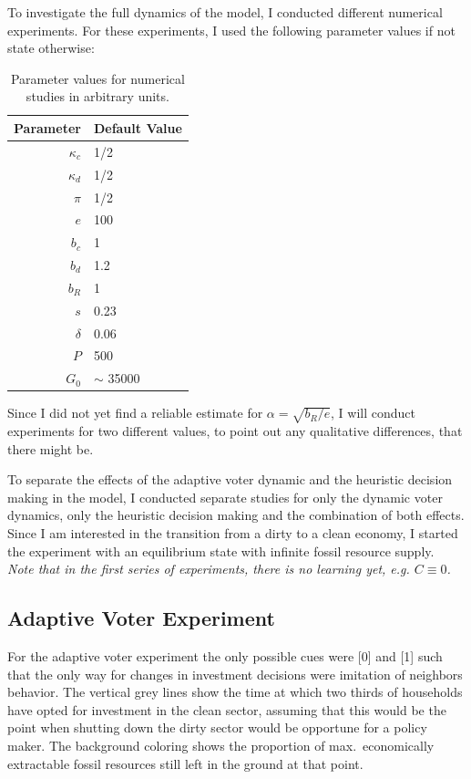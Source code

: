 To investigate the full dynamics of the model, I conducted different numerical experiments. For these experiments, I used the following parameter values if not state otherwise:

\begin{table}[H] 
	\centering
	\begin{tabular}{r|l}
		Parameter & Default Value \\\hline
		$\kappa_c$ & 1/2 \\
		$\kappa_d$ & 1/2 \\
		$\pi$ & 1/2 \\
		$e$ & 100 \\
		$b_c$ & 1 \\
		$b_d$ & 1.2 \\
		$b_R$ & 1 \\
		$s$ & 0.23 \\
		$\delta $ & 0.06 \\
		$P$ & 500 \\
		$G_0$ & $\sim$ 35000 \\
	\end{tabular}
	\caption{Parameter values for numerical studies in arbitrary units.}
	\label{tab:parameter_values}
\end{table} 
Since I did not yet find a reliable estimate for $\alpha = \sqrt{b_R/e}$, I will conduct experiments for two different values, to point out any qualitative differences, that there might be.

To separate the effects of the adaptive voter dynamic and the heuristic decision making in the model, I conducted separate studies for only the dynamic voter dynamics, only the heuristic decision making and the combination of both effects. \\
Since I am interested in the transition from a dirty to a clean economy, I started the experiment with an equilibrium state with infinite fossil resource supply.\\

\textit{Note that in the first series of experiments, there is no learning yet, e.g. $C \equiv 0$.}

\subsection{Adaptive Voter Experiment}
For the adaptive voter experiment the only possible cues were [0] and [1] such that the only way for changes in investment decisions were imitation of neighbors behavior.
The vertical grey lines show the time at which two thirds of households have opted for investment in the clean sector, assuming that this would be the point when shutting down the dirty sector would be opportune for a policy maker. The background coloring shows the proportion of max.\ economically extractable fossil resources still left in the ground at that point.
